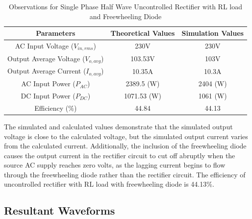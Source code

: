 \begin{table}[h]
    \renewcommand{\arraystretch}{1.3}
    \label{table_observation_single-phase-half-wave-uncontrolled-rectifier-with-RL-load-and-freewheeling-diode}
    \centering
    \begin{tabular}{|c|c|c|}
        \hline
        Parameters                              & Theoretical Values & Simulation Values \\
        \hline
        \hline
        AC Input Voltage ($ V_{in,rms} $)       & 230V               & 230V              \\
        \hline
        Output Average Voltage ($ V_{o,avg} $)  & 103.53V            & 103V              \\
        \hline
        Output Average Current ($ I_{o,avg}  $) & 10.35A             & 10.3A             \\
        \hline
        AC Input Power ($ P_{AC}  $)            & 2389.5 (W)         & 2404 (W)          \\
        \hline
        DC Input Power ($ P_{DC}  $)            & 1071.53 (W)        & 1061 (W)          \\
        \hline
        Efficiency (\%)                         & 44.84              & 44.13              \\
        \hline
    \end{tabular}
    \caption{Observations for Single Phase Half Wave Uncontrolled Rectifier with RL load and Freewheeling Diode}

\end{table}



The simulated and calculated values demonstrate that the simulated output voltage is close to the calculated voltage, but the simulated output current varies from the calculated current. Additionally, the inclusion of the freewheeling diode causes the output current in the rectifier circuit to cut off abruptly when the source AC supply reaches zero volts, as the lagging current begins to flow through the freewheeling diode rather than the rectifier circuit.
The efficiency of uncontrolled rectifier with RL load with freewheeling diode is 44.13\%.

\pagebreak

\subsection{Resultant Waveforms}


